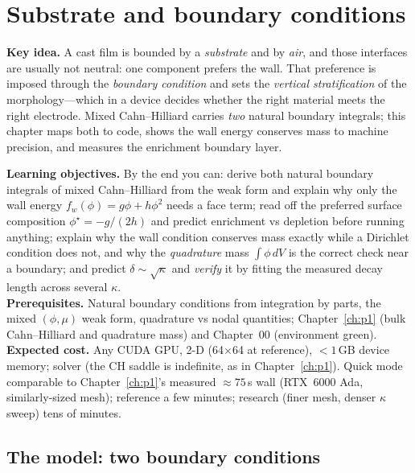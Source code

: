 \chapter{Substrate and boundary conditions}
\label{ch:p3}

\begin{keybox}
\textbf{Key idea.} A cast film is bounded by a \emph{substrate} and by
\emph{air}, and those interfaces are usually not neutral: one component
prefers the wall. That preference is imposed through the
\emph{boundary condition} and sets the \emph{vertical stratification} of
the morphology---which in a device decides whether the right material
meets the right electrode. Mixed Cahn--Hilliard carries \emph{two}
natural boundary integrals; this chapter maps both to code, shows the
wall energy conserves mass to machine precision, and measures the
enrichment boundary layer.
\end{keybox}

\begin{keybox}
\textbf{Learning objectives.} By the end you can: derive both natural
boundary integrals of mixed Cahn--Hilliard from the weak form and explain
why only the wall energy $f_w(\phi)=g\phi+h\phi^2$ needs a face term;
read off the preferred surface composition $\phi^\star=-g/(2h)$ and
predict enrichment vs depletion before running anything; explain why the
wall condition conserves mass exactly while a Dirichlet condition does
not, and why the \emph{quadrature} mass $\int\phi\,dV$ is the correct
check near a boundary; and predict $\delta\sim\sqrt\kappa$ and
\emph{verify} it by fitting the measured decay length across several
$\kappa$.\\[2pt]
\textbf{Prerequisites.} Natural boundary conditions from integration by
parts, the mixed $(\phi,\mu)$ weak form, quadrature vs nodal quantities;
Chapter~\ref{ch:p1} (bulk Cahn--Hilliard and quadrature mass) and
Chapter~00 (environment green).\\[2pt]
\textbf{Expected cost.} Any CUDA GPU, 2-D (64$\times$64 at reference),
$<1$\,GB device memory; solver  (the CH saddle is indefinite,
as in Chapter~\ref{ch:p1}). Quick mode comparable to Chapter~\ref{ch:p1}'s
measured $\approx75$\,s wall (RTX~6000 Ada, similarly-sized mesh);
reference a few minutes; research (finer mesh, denser $\kappa$ sweep)
tens of minutes.
\end{keybox}

\section{The model: two boundary conditions}

